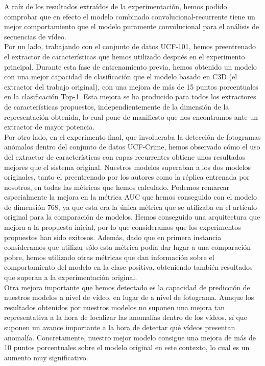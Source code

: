 \documentclass[../main.tex]{memoir}
\begin{document}
A raíz de los resultados extraídos de la experimentación, hemos podido
comprobar que en efecto el modelo combinado convolucional-recurrente
tiene un mejor comportamiento que el modelo puramente convolucional
para el análisis de secuencias de vídeo.\\

Por un lado, trabajando con el conjunto de datos UCF-101, hemos
preentrenado el extractor de características que hemos utilizado
después en el experimento principal. Durante esta fase de
entrenamiento previa, hemos obtenido un modelo con una mejor capacidad
de clasificación que el modelo basado en C3D (el extractor del trabajo
original), con una mejora de más de 15 puntos porcentuales en la
clasificación Top-1. Esta mejora se ha producido para todos los
extractores de características propuestos, independientemente de la
dimensión de la representación obtenida, lo cual pone de manifiesto
que nos encontramos ante un extractor de mayor potencia.\\

Por otro lado, en el experimento final, que involucraba la detección
de fotogramas anómalos dentro del conjunto de datos UCF-Crime, hemos
observado cómo el uso del extractor de características con capas
recurrentes obtiene unos resultados mejores que el sistema
original. Nuestros modelos superaban a los dos modelos originales,
tanto el preentrenado por los autores como la réplica entrenada por
nosotros, en todas las métricas que hemos calculado. Podemos remarcar
especialmente la mejora en la métrica AUC que hemos conseguido con el
modelo de dimensión 768, ya que esta era la única métrica que se
utilizaba en el artículo original para la comparación de modelos.
Hemos conseguido una arquitectura que mejora a la propuesta inicial,
por lo que consideramos que los experimentos propuestos han sido
exitosos. Además, dado que en primera instancia consideramos que
utilizar sólo esta métrica podía dar lugar a una comparación pobre,
hemos utilizado otras métricas que dan información sobre el
comportamiento del modelo en la clase positiva, obteniendo también
resultados que superan a la experimentación original.\\

Otra mejora importante que hemos detectado es la capacidad de
predicción de nuestros modelos a nivel de vídeo, en lugar de a nivel
de fotograma. Aunque los resultados obtenidos por nuestros modelos no
suponen una mejora tan representativa a la hora de localizar las
anomalías dentro de los vídeos, sí que suponen un avance importante a
la hora de detectar qué vídeos presentan anomalía. Concretamente,
nuestro mejor modelo consigue una mejora de más de 10 puntos
porcentuales sobre el modelo original en este contexto, lo cual es un
aumento muy significativo.\\
\end{document}
